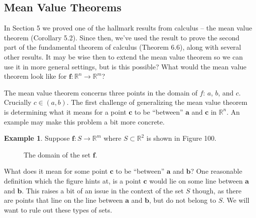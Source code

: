 \documentclass{article}
\newcommand{\R}{\mathbb{R}}
\newcommand{\f}{\mathbf{f}}
\theoremstyle{definition}
\newtheorem{example}{Example}[section]
\begin{document}
	\subsection{Mean Value Theorems}
	In Section 5 we proved one of the hallmark results from calculus -- the mean value theorem (Corollary 5.2). Since then, we've used the result to prove the second part of the fundamental theorem of calculus (Theorem 6.6), along with several other results. It may be wise then to extend the mean value theorem so we can use it in more general settings, but is this possible? What would the mean value theorem look like for $ \f:\R^n\to \R^m $? 
	
	The mean value theorem concerns three points in the domain of $ f $: $ a $, $ b $, and $ c $. Crucially $ c\in(a,b) $. The first challenge of generalizing the mean value theorem is determining what it means for a point $ \mathbf c $ to be ``between'' $ \mathbf a $ and $ \mathbf c $ in $ \R^n $. An example may make this problem a bit more concrete. 
	\begin{example}
		Suppose $ \f:S\to\R^m $ where $ S\subset \R^2 $ is shown in Figure 100. 
		\begin{figure}[h!]
			\centering
			\caption{The domain of the set $ \f $.}
		\end{figure}	
		What does it mean for some point $ \mathbf c $ to be ``between'' $ \mathbf a $ and $ \mathbf b $? One reasonable definition which the figure hints at, is a point $ \mathbf c $ would lie on some line between $ \mathbf a $ and $ \mathbf b $. This raises a bit of an issue in the context of the set $ S $ though, as there are points that line on the line between $ \mathbf a $ and $ \mathbf b $, but do not belong to $ S $. We will want to rule out these types of sets.
	\end{example}
\end{document}
